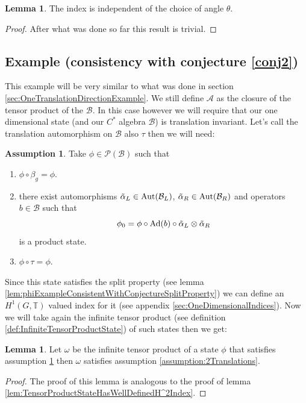 \documentclass[12pt,a4paper,twoside]{article}
\let\originalleft\left
\let\originalright\right
\renewcommand{\left}{\mathopen{}\mathclose\bgroup\originalleft}
\renewcommand{\right}{\aftergroup\egroup\originalright}
\newcommand{\BB}{\mathcal B}
\newcommand{\PP}{\mathcal P}
\newcommand{\TT}{\mathbb T}
\renewcommand{\AA}{\mathcal A}
\newcommand{\Ad}[1]{\textrm{Ad}\left(#1\right)}
\newcommand{\Aut}[1]{\textrm{Aut}\left(#1\right)}
\theoremstyle{definition}
\newtheorem{lemma}[theorem]{Lemma}
\newtheorem{assumption}[theorem]{Assumption}
\numberwithin{equation}{section}
\begin{document}
\begin{lemma}
	The index is independent of the choice of angle $\theta$.
\end{lemma}
\begin{proof}
	After what was done so far this result is trivial.
\end{proof}
\subsection{Example (consistency with conjecture \ref{conj2})}\label{sec:TwoTranslationDirectionsExample}
This example will be very similar to what was done in section \ref{sec:OneTranslationDirectionExample}. We still define $\AA$ as the closure of the tensor product of the $\BB$. In this case however we will require that our one dimensional state (and our $C^*$ algebra $\BB$) is translation invariant. Let's call the translation automorphism on $\BB$ also $\tau$ then we will need:
\begin{assumption}\label{assumption1dWithTranslation}
	Take $\phi\in\PP(\BB)$ such that
	\begin{enumerate}
		\item $\phi\circ\beta_g=\phi$.
		\item there exist automorphisms $\tilde\alpha_L\in\Aut{\BB_L}$, $\tilde\alpha_R\in\Aut{\BB_R}$ and operators $b\in\BB$ such that
		\begin{equation}
			\phi_0=\phi\circ\Ad{b}\circ\tilde\alpha_L\otimes\tilde\alpha_R
		\end{equation}
		is a product state.
		\item $\phi\circ\tau=\phi$.
	\end{enumerate}
\end{assumption}
Since this state satisfies the split property (see lemma \ref{lem:phiExampleConsistentWithConjectureSplitProperty}) we can define an $H^1(G,\TT)$ valued index for it (see appendix \ref{sec:OneDimensionalIndices}). Now we will take again the infinite tensor product (see definition \ref{def:InfiniteTensorProductState}) of such states then we get:
\begin{lemma}
	Let $\omega$ be the infinite tensor product of a state $\phi$ that satisfies assumption \ref{assumption1dWithTranslation} then $\omega$ satisfies assumption \ref{assumption:2Translations}.
\end{lemma}
\begin{proof}
	The proof of this lemma is analogous to the proof of lemma \ref{lem:TensorProductStateHasWellDefinedH^2Index}.
\end{proof}
\end{document}
